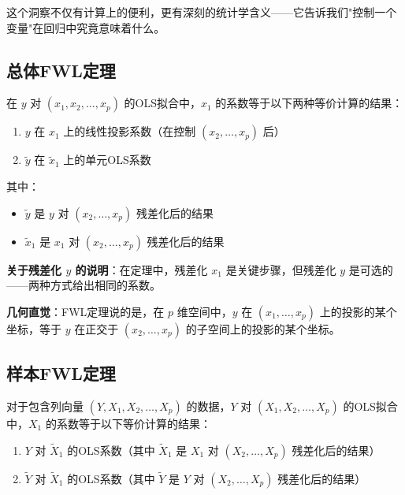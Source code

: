 这个洞察不仅有计算上的便利，更有深刻的统计学含义——它告诉我们"控制一个变量"在回归中究竟意味着什么。

\subsection{总体FWL定理}\label{sec:B-fwl-population}

\begin{Theorem}[总体FWL定理]\label{B-thm:FWL-population}
在 $y$ 对 $(x_1, x_2, \ldots, x_p)$ 的OLS拟合中，$x_1$ 的系数等于以下两种等价计算的结果：
\begin{enumerate}
  \item $y$ 在 $x_1$ 上的线性投影系数（在控制 $(x_2, \ldots, x_p)$ 后）
  \item $\tilde{y}$ 在 $\tilde{x}_1$ 上的单元OLS系数
\end{enumerate}

其中：
\begin{itemize}
  \item $\tilde{y}$ 是 $y$ 对 $(x_2, \ldots, x_p)$ 残差化后的结果
  \item $\tilde{x}_1$ 是 $x_1$ 对 $(x_2, \ldots, x_p)$ 残差化后的结果
\end{itemize}
\end{Theorem}

\textbf{关于残差化 $y$ 的说明}：在定理中，残差化 $x_1$ 是关键步骤，但残差化 $y$ 是可选的——两种方式给出相同的系数。

\textbf{几何直觉}：FWL定理说的是，在 $p$ 维空间中，$y$ 在 $(x_1, \ldots, x_p)$ 上的投影的某个坐标，等于 $y$ 在正交于 $(x_2, \ldots, x_p)$ 的子空间上的投影的某个坐标。

\subsection{样本FWL定理}\label{sec:B-fwl-sample}

\begin{Theorem}[样本FWL定理]\label{B-thm:FWL-sample}
对于包含列向量 $(Y, X_1, X_2, \ldots, X_p)$ 的数据，$Y$ 对 $(X_1, X_2, \ldots, X_p)$ 的OLS拟合中，$X_1$ 的系数等于以下等价计算的结果：
\begin{enumerate}
  \item $Y$ 对 $\tilde{X}_1$ 的OLS系数（其中 $\tilde{X}_1$ 是 $X_1$ 对 $(X_2, \ldots, X_p)$ 残差化后的结果）
  \item $\tilde{Y}$ 对 $\tilde{X}_1$ 的OLS系数（其中 $\tilde{Y}$ 是 $Y$ 对 $(X_2, \ldots, X_p)$ 残差化后的结果）
\end{enumerate}
\end{Theorem}

